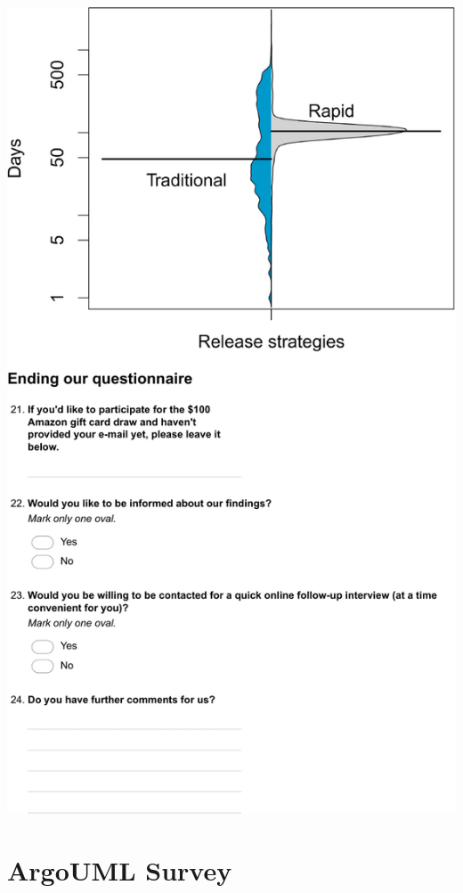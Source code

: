 \includegraphics[width=.9\textwidth]{chapters/chapter5/appendix/Firefox7.pdf}

\chapter{ArgoUML Survey}\label{appendix:b}

